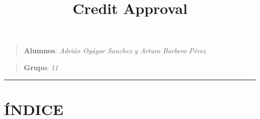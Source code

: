 \documentclass[11pt]{article}
\title{Credit Approval}
\begin{document}
    
    
    \maketitle
    
    

    
    \begin{quote}
\textbf{Alumnos}: \emph{Adrián Ogáyar Sanchez y Arturo Barbero Pérez}
\end{quote}

\begin{quote}
\textbf{Grupo}: \emph{11}
\end{quote}

\begin{center}\rule{0.5\linewidth}{\linethickness}\end{center}

    \section{ÍNDICE}\label{uxedndice}
\end{document}
